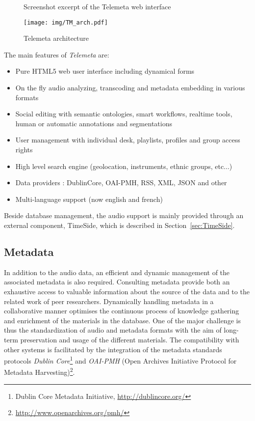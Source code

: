 \documentclass{paper}
\begin{document}
\begin{figure}
   \centering
   \caption[1]{Screenshot excerpt of the Telemeta web interface}
    \label{fig:Telemeta}
 \end{figure}

\begin{figure*}[htbp]
  \centering
  \texttt{[image: img/TM\_arch.pdf]}
  \caption{Telemeta architecture}\label{fig:TM_arch}
\end{figure*}

The main features of \emph{Telemeta} are:

      \begin{itemize}
      \item Pure HTML5 web user interface including dynamical forms
      \item On the fly audio analyzing, transcoding and metadata
        embedding in various formats
      \item Social editing with semantic ontologies, smart workflows,
        realtime tools, human or automatic annotations and
        segmentations
      \item User management with individual desk, playlists, profiles
        and group access rights
      \item High level search engine (geolocation, instruments, ethnic groups, etc...)
      \item Data providers : DublinCore, OAI-PMH, RSS, XML, JSON and other 
      \item Multi-language support (now english and french)
      \end{itemize}

Beside database management, the audio support is mainly provided through an external component, TimeSide, which is described in Section~\ref{sec:TimeSide}.

\subsection{Metadata}\label{sec:metadata}
In addition to the audio data, an efficient and dynamic management of the associated metadata is also required. Consulting metadata provide both an exhaustive access to valuable information about the source of the data and to the related work of peer researchers. 
Dynamically handling metadata in a collaborative manner optimises the continuous process of knowledge gathering and enrichment of the materials in the database.  
One of the major challenge is thus the standardization of audio and metadata formats with the aim of long-term preservation and usage of the different materials.
The compatibility with other systems is facilitated by the integration of the metadata standards protocols \emph{Dublin Core}\footnote{{Dublin Core} Metadata Initiative, \url{http://dublincore.org/}} and \emph{OAI-PMH} (Open Archives Initiative Protocol for Metadata Harvesting)\footnote{\url{http://www.openarchives.org/pmh/}}.
\end{document}
